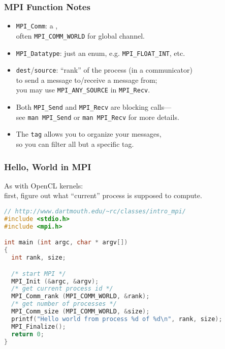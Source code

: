 \documentclass[aspectratio=43]{beamer}
\newenvironment{changemargin}[1]{%
  \begin{list}{}{%
    \setlength{\topsep}{0pt}%
    \setlength{\leftmargin}{#1}%
    \setlength{\rightmargin}{1em}
    \setlength{\listparindent}{\parindent}%
    \setlength{\itemindent}{\parindent}%
    \setlength{\parsep}{\parskip}%
  }%
  \item[]}{\end{list}}
\begin{document}
\begin{frame}
  \frametitle{MPI Function Notes}
  \begin{changemargin}{1cm}

  \begin{itemize}
    \item {\tt MPI\_Comm}: a , \\
      \qquad often {\tt MPI\_COMM\_WORLD} for global channel.
    \item {\tt MPI\_Datatype}: just an enum, e.g. {\tt MPI\_FLOAT\_INT}, etc.\\[1em]


    \item {\tt dest}/{\tt source}: ``rank'' of the process (in a communicator) \\
      to send a
      message to/receive a message from;\\
        \qquad you may use {\tt MPI\_ANY\_SOURCE} in {\tt MPI\_Recv}.\\[1em]

    \item Both {\tt MPI\_Send} and {\tt MPI\_Recv} are blocking calls---\\
      \qquad see {\tt man MPI\_Send} or {\tt man MPI\_Recv} for more details.

    \item The {\tt tag} allows you to organize your messages, \\ \qquad so you can
      filter all but a specific tag.
  \end{itemize}
  \end{changemargin}
\end{frame}

\begin{frame}[fragile]
  \frametitle{Hello, World in MPI}
  \begin{changemargin}{1cm}
As with OpenCL kernels:\\
\quad first, figure out what ``current'' process is supposed to compute.\\

{\small
\begin{lstlisting}[language=C]
// http://www.dartmouth.edu/~rc/classes/intro_mpi/
#include <stdio.h>
#include <mpi.h>

int main (int argc, char * argv[])
{
  int rank, size;

  /* start MPI */
  MPI_Init (&argc, &argv);	
  /* get current process id */
  MPI_Comm_rank (MPI_COMM_WORLD, &rank);	
  /* get number of processes */
  MPI_Comm_size (MPI_COMM_WORLD, &size);	
  printf("Hello world from process %d of %d\n", rank, size);
  MPI_Finalize();
  return 0;
}
\end{lstlisting}
}
  \end{changemargin}
\end{frame}
\end{document}
